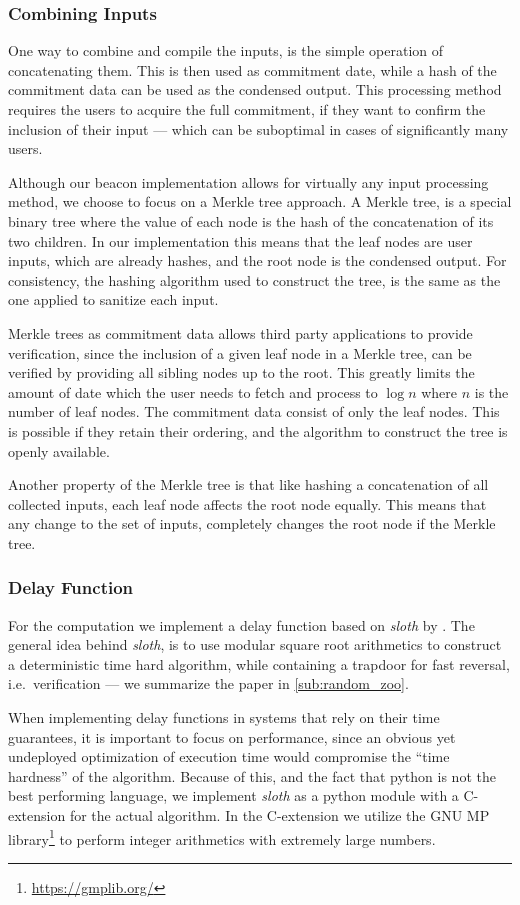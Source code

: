 \subsubsection{Combining Inputs}%
\label{ssub:combining_inputs}
One way to combine and compile the inputs, is the simple operation of concatenating them.
This is then used as commitment date, while a hash of the commitment data can be used as the condensed output.
This processing method requires the users to acquire the full commitment, if they want to confirm the inclusion of their input --- which can be suboptimal in cases of significantly many users.

Although our beacon implementation allows for virtually any input processing method, we choose to focus on a Merkle tree approach.
A Merkle tree, is a special binary tree where the value of each node is the hash of the concatenation of its two children.
In our implementation this means that the leaf nodes are user inputs, which are already hashes, and the root node is the condensed output.
For consistency, the hashing algorithm used to construct the tree, is the same as the one applied to sanitize each input.

Merkle trees as commitment data allows third party applications to provide verification, since the inclusion of a given leaf node in a Merkle tree, can be verified by providing all sibling nodes up to the root.
This greatly limits the amount of date which the user needs to fetch and process to $\log{n}$ where $n$ is the number of leaf nodes.
The commitment data consist of only the leaf nodes.
This is possible if they retain their ordering, and the algorithm to construct the tree is openly available.

Another property of the Merkle tree is that like hashing a concatenation of all collected inputs, each leaf node affects the root node equally.
This means that any change to the set of inputs, completely changes the root node if the Merkle tree.

\subsubsection{Delay Function}%
\label{ssub:delay_function}
For the computation we implement a delay function based on \textit{sloth} by \citet{randomzoo}.
The general idea behind \textit{sloth}, is to use modular square root arithmetics to construct a deterministic time hard algorithm, while containing a trapdoor for fast reversal, i.e.\ verification --- we summarize the paper in \cref{sub:random_zoo}.

When implementing delay functions in systems that rely on their time guarantees, it is important to focus on performance, since an obvious yet undeployed optimization of execution time would compromise the \enquote{time hardness} of the algorithm.
Because of this, and the fact that python is not the best performing language, we implement \textit{sloth} as a python module with a C-extension for the actual algorithm.
In the C-extension we utilize the GNU MP library\footnote{\url{https://gmplib.org/}} to perform integer arithmetics with extremely large numbers.

